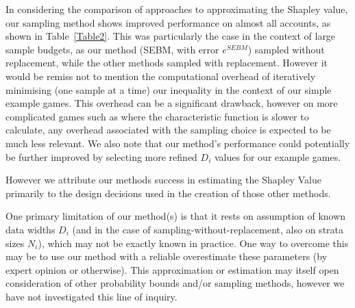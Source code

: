 
In considering the comparison of approaches to approximating the Shapley value, our sampling method shows improved performance on almost all accounts, as shown in Table~\ref{Table2}.
This was particularly the case in the context of large sample budgets, as our method (SEBM, with error $e^{SEBM}$) sampled without replacement, while the other methods sampled with replacement. 
However it would be remiss not to mention the computational overhead of iteratively minimising (one sample at a time) our inequality in the context of our simple example games. 
This overhead can be a significant drawback, however on more complicated games such as where the characteristic function is slower to calculate, any overhead associated with the sampling choice is expected to be much less relevant. 
We also note that our method's performance could potentially be further improved by selecting more refined $D_i$ values for our example games.

However we attribute our methods success in estimating the Shapley Value primarily to the design decisions used in the creation of those other methods.

% 




One primary limitation of our method(s) is that it rests on assumption of known data widths $D_i$ (and in the case of sampling-without-replacement, also on strata sizes $N_i$), which may not be exactly known in practice.
One way to overcome this may be to use our method with a reliable overestimate these parameters (by expert opinion or otherwise). This approximation or estimation may itself open consideration of other probability bounds and/or sampling methods, however we have not investigated this line of inquiry. 

